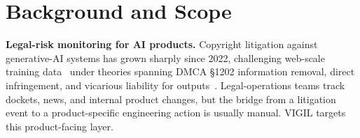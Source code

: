 \section{Background and Scope}

\textbf{Legal-risk monitoring for AI products.} Copyright litigation against generative-AI systems has grown sharply since 2022, challenging web-scale training data~\citep{henderson2023foundation,levendowski2018copyright} under theories spanning DMCA \S1202 information removal, direct infringement, and vicarious liability for outputs~\citep{grimmelmann2015copyright}. Legal-operations teams track dockets, news, and internal product changes, but the bridge from a litigation event to a product-specific engineering action is usually manual. VIGIL targets this product-facing layer.
